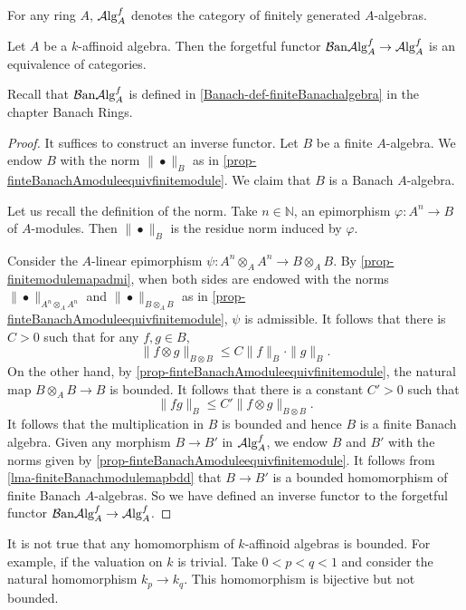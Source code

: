For any ring $A$, $\mathcal{A}\mathrm{lg}_A^f$ denotes the category of finitely generated $A$-algebras.

\begin{proposition}
    Let $A$ be a $k$-affinoid algebra. Then the forgetful functor $\mathcal{B}\mathrm{an}\mathcal{A}\mathrm{lg}_A^f\rightarrow \mathcal{A}\mathrm{lg}_A^f$ is an equivalence of categories.
\end{proposition}
Recall that $\mathcal{B}\mathrm{an}\mathcal{A}\mathrm{lg}_A^f$ is defined in \cref{Banach-def-finiteBanachalgebra} in the chapter Banach Rings.
\begin{proof}
    It suffices to construct an inverse functor. Let $B$ be a finite $A$-algebra. 
    We endow $B$ with the norm $\|\bullet\|_B$ as in \cref{prop-finteBanachAmoduleequivfinitemodule}. We claim that $B$ is a Banach $A$-algebra.

    Let us recall the definition of the norm.
    Take $n\in \mathbb{N}$, an epimorphism $\varphi:A^n\rightarrow B$ of $A$-modules. Then $\|\bullet\|_B$ is the residue norm induced by $\varphi$.

    Consider the $A$-linear epimorphism $\psi:A^n\otimes_A A^n\rightarrow B\otimes_A B$. By \cref{prop-finitemodulemapadmi}, when both sides are endowed with the norms $\|\bullet\|_{A^n\otimes_A A^n}$ and $\|\bullet\|_{B\otimes_A B}$ as in \cref{prop-finteBanachAmoduleequivfinitemodule}, $\psi$ is admissible. It follows that there is $C>0$ such that for any $f,g\in B$,
    \[
        \|f\otimes g\|_{B\otimes B}\leq C\|f\|_B \cdot\|g\|_B.  
    \]
    On the other hand, by \cref{prop-finteBanachAmoduleequivfinitemodule}, the natural map $B\otimes_A B\rightarrow B$ is bounded. It follows that there is a constant $C'>0$ such that
    \[
        \|fg\|_B\leq C'\|f\otimes g\|_{B\otimes B}.
    \]
    It follows that the multiplication in $B$ is bounded and hence $B$ is a finite Banach algebra. Given any morphism $B\rightarrow B'$ in $\mathcal{A}\mathrm{lg}_A^f$, we endow $B$ and $B'$ with the norms given by \cref{prop-finteBanachAmoduleequivfinitemodule}. It follows from \cref{lma-finiteBanachmodulemapbdd} that $B\rightarrow B'$ is a bounded homomorphism of finite Banach $A$-algebras. So we have defined an inverse functor to the forgetful functor $\mathcal{B}\mathrm{an}\mathcal{A}\mathrm{lg}_A^f\rightarrow \mathcal{A}\mathrm{lg}_A^f$.
\end{proof}
\begin{remark}
    It is not true that any homomorphism of $k$-affinoid algebras is bounded. For example, if the valuation on $k$ is trivial. Take $0<p<q<1$ and consider the natural homomorphism $k_p\rightarrow k_q$. This homomorphism is bijective but not bounded.
\end{remark}


